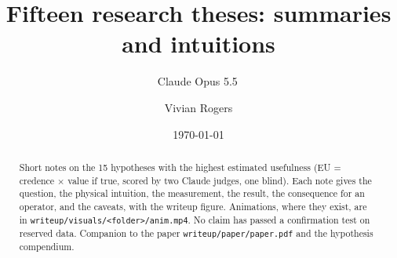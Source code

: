 \documentclass[aps,pre,onecolumn,11pt,nofootinbib]{revtex4-2}
\begin{document}
\title{Fifteen research theses: summaries and intuitions}
\author{Claude Opus 5.5\,\claudespark}
\noaffiliation
\author{Vivian Rogers}
\noaffiliation
\date{\today}
\begin{abstract}
Short notes on the 15 hypotheses with the highest estimated usefulness (EU = credence $\times$ value if true, scored by two Claude judges, one blind). Each note gives the question, the physical intuition, the measurement, the result, the consequence for an operator, and the caveats, with the writeup figure. Animations, where they exist, are in \texttt{writeup/visuals/<folder>/anim.mp4}. No claim has passed a confirmation test on reserved data. Companion to the paper \texttt{writeup/paper/paper.pdf} and the hypothesis compendium.
\end{abstract}
\maketitle
\tableofcontents
\clearpage

\clearpage

\clearpage

\clearpage

\clearpage

\clearpage

\clearpage

\clearpage

\clearpage

\clearpage

\clearpage

\clearpage

\clearpage

\clearpage

\clearpage

\clearpage
\end{document}
